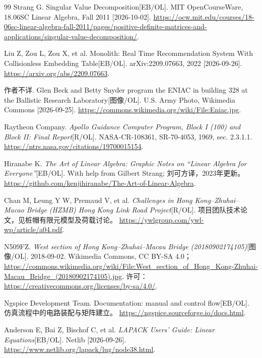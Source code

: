 \documentclass[a4paper,12pt,twoside,openany,fontset=none]{ctexbook}
\numberwithin{equation}{chapter}
\begin{document}
\begin{thebibliography}{99}
Strang G. Singular Value Decomposition[EB/OL]. MIT OpenCourseWare, 18.06SC Linear Algebra, Fall 2011 [2026-10-02].
\newblock \url{https://ocw.mit.edu/courses/18-06sc-linear-algebra-fall-2011/pages/positive-definite-matrices-and-applications/singular-value-decomposition/}.

Liu Z, Zou L, Zou X, et al. Monolith: Real Time Recommendation System With Collisionless Embedding Table[EB/OL]. arXiv:2209.07663, 2022 [2026-09-26].
\newblock \url{https://arxiv.org/abs/2209.07663}.


作者不详. Glen Beck and Betty Snyder program the ENIAC in building 328 at the Ballistic Research Laboratory[图像/OL]. U.S. Army Photo, Wikimedia Commons \mbox{[2026-09-25]}.
\newblock \url{https://commons.wikimedia.org/wiki/File:Eniac.jpg}.

Raytheon Company. \textit{Apollo Guidance Computer Program, Block I (100) and Block II: Final Report}[R/OL]. NASA-CR-108361, SR-70-4053, 1969, sec. 2.3.1.1.
\newblock \url{https://ntrs.nasa.gov/citations/19700015154}.


Hiranabe K. \textit{The Art of Linear Algebra: Graphic Notes on ``Linear Algebra for Everyone''}[EB/OL]. With help from Gilbert Strang; 刘可方译，2023年更新。
\newblock \url{https://github.com/kenjihiranabe/The-Art-of-Linear-Algebra}.

Chan M, Leung Y W, Premaud V, et al. \textit{Challenges in Hong Kong--Zhuhai--Macao Bridge (HZMB) Hong Kong Link Road Project}[R/OL]. 项目团队技术论文，见桩帽有限元模型及荷载讨论。
\newblock \url{https://ywlgroup.com/ywl-wp/article/a04.pdf}.

N509FZ. \textit{West section of Hong Kong--Zhuhai--Macau Bridge (20180902174105)}[图像/OL]. 2018-09-02. Wikimedia Commons, CC BY-SA 4.0；
\newblock \url{https://commons.wikimedia.org/wiki/File:West_section_of_Hong_Kong-Zhuhai-Macau_Bridge_(20180902174105).jpg}.
\newblock 许可：\url{https://creativecommons.org/licenses/by-sa/4.0/}.

Ngspice Development Team. Documentation: manual and control flow[EB/OL]. 仿真流程中的电路装配与矩阵建立。
\newblock \url{https://ngspice.sourceforge.io/docs.html}.


Anderson E, Bai Z, Bischof C, et al. \textit{LAPACK Users' Guide: Linear Equations}[EB/OL]. Netlib [2026-09-26].
\newblock \url{https://www.netlib.org/lapack/lug/node38.html}.


\end{thebibliography}
\end{document}
